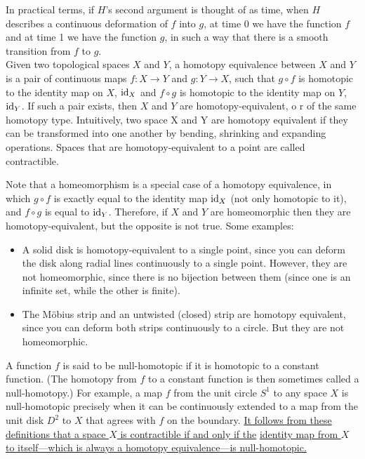 \documentclass{homework}
\begin{document}
In practical terms, if $H$'s second argument is thought of as time, when $H$ describes a continuous deformation of $f$ into $g$, at time 0 we have the function $f$ and at time 1 we have the function $g$, in such a way that there is a smooth transition from $f$ to $g$. \\

Given two topological spaces $X$ and $Y$, a homotopy equivalence between $X$ and $Y$ is a pair of continuous maps $f: X \to Y$ and $g: Y \to X$, such that $ g \circ f $ is homotopic to the identity map on $X$, $\textnormal{id}_X$ and $ f \circ g $ is homotopic to the identity map on $Y$, $\textnormal{id}_Y$. If such a pair exists, then $X$ and $Y$ are homotopy-equivalent, o r of the same homotopy type. Intuitively, two space X and Y are homotopy equivalent if they can be transformed into one another by bending, shrinking and expanding operations. Spaces that are homotopy-equivalent to a point are called contractible.

Note that a homeomorphism is a special case of a homotopy equivalence, in which $g \circ f$ is exactly equal to the identity map $\textnormal{id}_X$ (not only homotopic to it), and $f \circ g$ is equal to $\textnormal{id}_Y$. Therefore, if $X$ and $Y$ are homeomorphic then they are homotopy-equivalent, but the opposite is not true. Some examples:

\begin{itemize}
    \item A solid disk is homotopy-equivalent to a single point, since you can deform the disk along radial lines continuously to a single point. However, they are not homeomorphic, since there is no bijection between them (since one is an infinite set, while the other is finite).
    \item The Möbius strip and an untwisted (closed) strip are homotopy equivalent, since you can deform both strips continuously to a circle. But they are not homeomorphic. \\
\end{itemize}

A function $f$ is said to be null-homotopic if it is homotopic to a constant function. (The homotopy from $f$ to a constant function is then sometimes called a null-homotopy.) For example, a map $f$ from the unit circle $S^1$ to any space $X$ is null-homotopic precisely when it can be continuously extended to a map from the unit disk $D^2$ to $X$ that agrees with $f$ on the boundary. \underline{It follows from these definitions that a space $X$ is contractible if and only if the}
\underline{ identity map from $X$ to itself—which is always a homotopy equivalence—is null-homotopic.} \\
\end{document}
